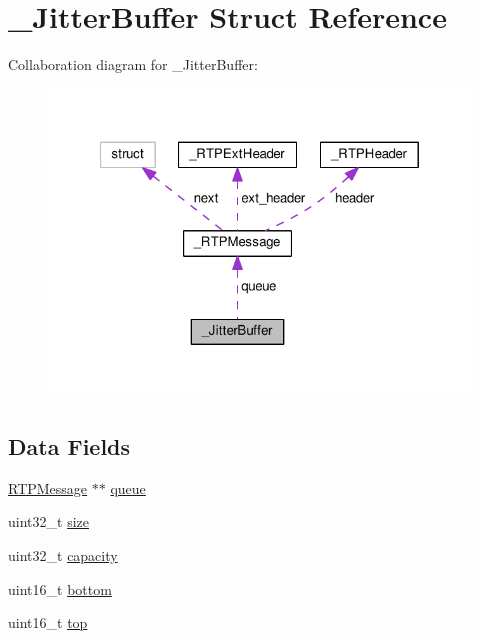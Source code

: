 \hypertarget{struct___jitter_buffer}{\section{\+\_\+\+Jitter\+Buffer Struct Reference}
\label{struct___jitter_buffer}
}


Collaboration diagram for \+\_\+\+Jitter\+Buffer\+:
\nopagebreak
\begin{figure}[H]
\begin{center}
\leavevmode
\includegraphics[width=321pt]{d1/d88/struct___jitter_buffer__coll__graph}
\end{center}
\end{figure}
\subsection*{Data Fields}
\begin{DoxyCompactItemize}
\item 
\hyperlink{rtp_8h_ab98525fe7a493c34d9dc586aa5b029b6}{R\+T\+P\+Message} $\ast$$\ast$ \hyperlink{struct___jitter_buffer_aba0e7057fa735d7bfaa585fd7bf43a24}{queue}
\item 
uint32\+\_\+t \hyperlink{struct___jitter_buffer_ab2c6b258f02add8fdf4cfc7c371dd772}{size}
\item 
uint32\+\_\+t \hyperlink{struct___jitter_buffer_a391c992c66c3e5540265a85ec2b9216a}{capacity}
\item 
uint16\+\_\+t \hyperlink{struct___jitter_buffer_a12c8099ac87952580dd090215e02728c}{bottom}
\item 
uint16\+\_\+t \hyperlink{struct___jitter_buffer_a0c235a6df98714bb18538fc0afc5bad1}{top}
\end{DoxyCompactItemize}


